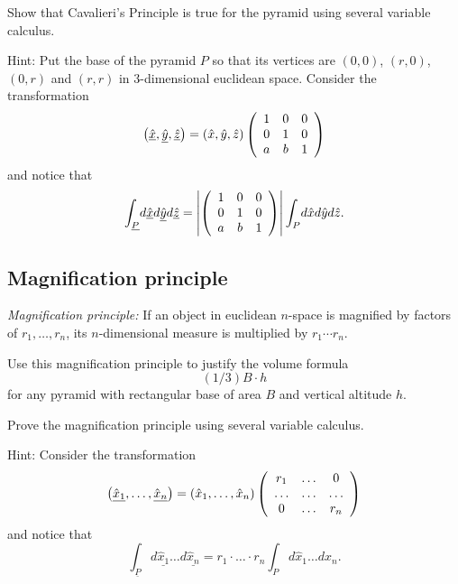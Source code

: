 \documentclass{ximera}
\begin{document}
\begin{exercise}
Show that Cavalieri's Principle is true for the pyramid using several
variable calculus.

Hint: Put the base of the pyramid $P$ so that its vertices are $\left(
0,0\right) $, $\left( r,0\right) $, $\left( 0,r\right) $ and $\left(
r,r\right) $ in $3$-dimensional euclidean space. Consider the
transformation%
\[
\left(  \underline{\hat{x}},\underline{\hat{y}},\underline{\hat{z}}\right)
=\left(  \hat{x},\hat{y},\hat{z}\right)  \left(
\begin{array}
[c]{ccc}%
1 & 0 & 0\\
0 & 1 & 0\\
a & b & 1
\end{array}
\right)
\]
and notice that%
\[
{\displaystyle\int\nolimits_{\underline{P}}}
d\underline{\hat{x}}d\underline{\hat{y}}d\underline{\hat{z}}=\left\vert
\left(
\begin{array}
[c]{ccc}%
1 & 0 & 0\\
0 & 1 & 0\\
a & b & 1
\end{array}
\right)  \right\vert
{\displaystyle\int\nolimits_{P}}
d\hat{x}d\hat{y}d\hat{z}.
\]
\end{exercise}

\subsection*{Magnification principle}

\textit{Magnification principle:} If an object in euclidean $n$-space is
magnified by factors of $r_{1},\ldots,r_{n}$, its $n$-dimensional
measure is multiplied by $r_{1}\cdots r_{n}$.

\begin{exercise}
Use this magnification principle to justify the volume formula%
\[
(1/3)B\cdot h
\]
for any pyramid with rectangular base of area $B$ and vertical altitude $h$.
\end{exercise}

\begin{exercise}
Prove the magnification principle using several variable calculus.

Hint: Consider the transformation%
\[
\left(  \underline{\hat{x}_{1}},\ldots,\underline{\hat{x}_{n}}\right)
=\left(  \hat{x}_{1},\ldots,\hat{x}_{n}\right)  \left(
\begin{array}
[c]{ccc}%
r_{1} & \ldots & 0\\
\ldots & \ldots & \ldots\\
0 & \ldots & r_{n}%
\end{array}
\right)
\]
and notice that%
\[%
{\displaystyle\int\nolimits_{\underline{P}}}
d\underline{\hat{x}_{1}}\ldots d\underline{\hat{x}_{n}}=r_{1}%
\cdot\ldots\cdot r_{n}%
{\displaystyle\int\nolimits_{P}}
d\hat{x}_{1}\ldots d\hat{x}_{n}.
\]

\end{exercise}
\end{document}
